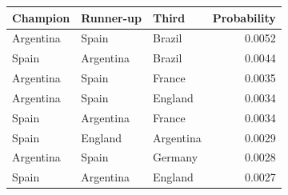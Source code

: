 \begin{tabular}{lllr}
\toprule
Champion & Runner-up & Third & Probability \\
\midrule
Argentina & Spain & Brazil & 0.0052 \\
Spain & Argentina & Brazil & 0.0044 \\
Argentina & Spain & France & 0.0035 \\
Argentina & Spain & England & 0.0034 \\
Spain & Argentina & France & 0.0034 \\
Spain & England & Argentina & 0.0029 \\
Argentina & Spain & Germany & 0.0028 \\
Spain & Argentina & England & 0.0027 \\
\bottomrule
\end{tabular}


